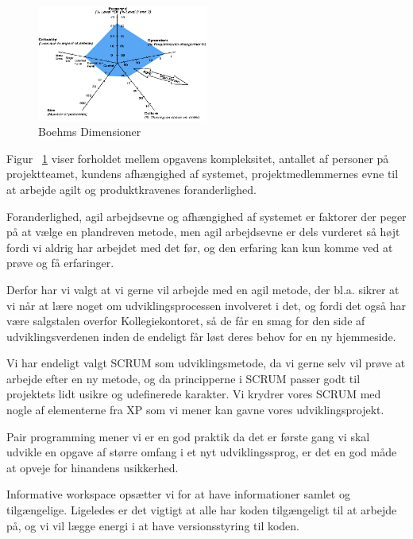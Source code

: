 \documentclass[12pt, a4paper]{report}
\begin{document}
\begin{figure}

\includegraphics[width=0.5\textwidth]{amoebe}

\caption{Boehms Dimensioner}

\label{amoeb}

\end{figure}

Figur ~\ref{amoeb} viser forholdet mellem opgavens kompleksitet, antallet af personer på projektteamet, kundens afhængighed af systemet, projektmedlemmernes evne til at arbejde agilt og produktkravenes foranderlighed.

Foranderlighed, agil arbejdsevne og afhængighed af systemet er faktorer der peger på at vælge en plandreven metode, men agil arbejdsevne er dels vurderet så højt fordi vi aldrig har arbejdet med det før, og den erfaring kan kun komme ved at prøve og få erfaringer.

Derfor har vi valgt at vi gerne vil arbejde med en agil metode, der bl.a. sikrer at vi når at lære noget om udviklingsprocessen involveret i det, og fordi det også har være salgstalen overfor Kollegiekontoret, så de får en smag for den side af udviklingsverdenen inden de endeligt får løst deres behov for en ny hjemmeside.

Vi har endeligt valgt SCRUM som udviklingsmetode, da vi gerne selv vil prøve at arbejde efter en ny metode, og da principperne i SCRUM passer godt til projektets lidt usikre og udefinerede karakter. Vi krydrer vores SCRUM med nogle af elementerne fra XP som vi mener kan gavne vores udviklingsprojekt.

Pair programming mener vi er en god praktik da det er første gang vi skal udvikle en opgave af større omfang i et nyt udviklingssprog, er det en god måde at opveje for hinandens usikkerhed.

Informative workspace opsætter vi for at have informationer samlet og tilgængelige. Ligeledes er det vigtigt at alle har koden tilgængeligt til at arbejde på, og vi vil lægge energi i at have versionsstyring til koden.
\end{document}
